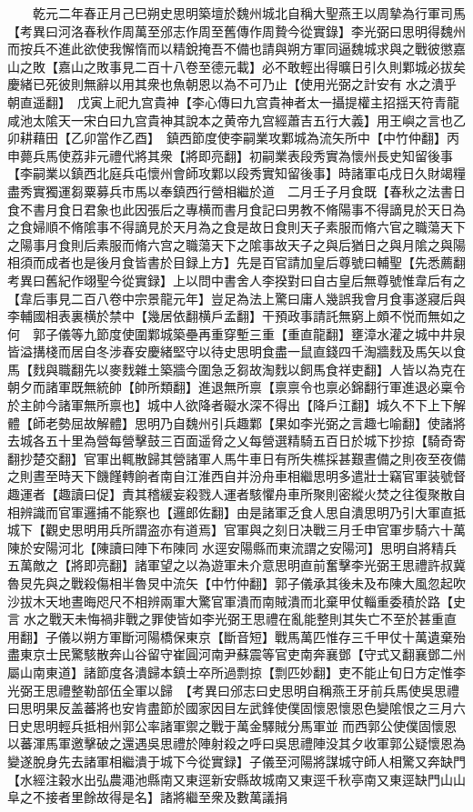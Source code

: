 　　乾元二年春正月己巳朔史思明築壇於魏州城北自稱大聖燕王以周摯為行軍司馬　【考異曰河洛春秋作周萬至邠志作周至舊傳作周贄今從實錄】李光弼曰思明得魏州而按兵不進此欲使我懈惰而以精銳掩吾不備也請與朔方軍同逼魏城求與之戰彼懲嘉山之敗【嘉山之敗事見二百十八卷至德元載】必不敢輕出得曠日引久則鄴城必拔矣慶緒已死彼則無辭以用其衆也魚朝恩以為不可乃止【使用光弼之計安有水之潰乎朝直遥翻】　戊寅上祀九宫貴神【李心傳曰九宫貴神者太一攝提權主招揺天符青龍咸池太隂天一宋白曰九宫貴神其說本之黄帝九宫經蕭吉五行大義】用王嶼之言也乙卯耕藉田【乙卯當作乙酉】　鎮西節度使李嗣業攻鄴城為流矢所中【中竹仲翻】丙申薨兵馬使荔非元禮代將其衆【將即亮翻】初嗣業表段秀實為懷州長史知留後事【李嗣業以鎮西北庭兵屯懷州會師攻鄴以段秀實知留後事】時諸軍屯戍日久財竭糧盡秀實獨運芻粟募兵市馬以奉鎮西行營相繼於道　二月壬子月食既【春秋之法書日食不書月食日君象也此因張后之專横而書月食記曰男教不脩陽事不得謫見於天日為之食婦順不脩隂事不得謫見於天月為之食是故日食則天子素服而脩六官之職蕩天下之陽事月食則后素服而脩六宫之職蕩天下之隂事故天子之與后猶日之與月隂之與陽相須而成者也是後月食皆書於目録上方】先是百官請加皇后尊號曰輔聖【先悉薦翻　考異曰舊紀作翊聖今從實録】上以問中書舍人李揆對曰自古皇后無尊號惟韋后有之【韋后事見二百八卷中宗景龍元年】豈足為法上驚曰庸人幾誤我會月食事遂寢后與李輔國相表裏横於禁中【幾居依翻横戶孟翻】干預政事請託無窮上頗不悦而無如之何　郭子儀等九節度使圍鄴城築壘再重穿塹三重【重直龍翻】壅漳水灌之城中井泉皆溢搆棧而居自冬涉春安慶緒堅守以待史思明食盡一鼠直錢四千淘牆䴰及馬矢以食馬【䴰與職翻先以麥䴰雜土築牆今圍急乏芻故淘䴰以飼馬食祥吏翻】人皆以為克在朝夕而諸軍既無統帥【帥所類翻】進退無所禀【禀禀令也禀必錦翻行軍進退必稟令於主帥今諸軍無所禀也】城中人欲降者礙水深不得出【降戶江翻】城久不下上下解體【師老勢屈故解體】思明乃自魏州引兵趣鄴【果如李光弼之言趣七喻翻】使諸將去城各五十里為營每營擊鼓三百面遥脅之乂每營選精騎五百日於城下抄掠【騎奇寄翻抄楚交翻】官軍出輒散歸其營諸軍人馬牛車日有所失樵採甚艱晝備之則夜至夜備之則晝至時天下饑饉轉餉者南自江淮西自并汾舟車相繼思明多遣壯士竊官軍装號督趣運者【趣讀曰促】責其稽緩妄殺戮人運者駭懼舟車所聚則密縱火焚之往復聚散自相辨識而官軍邏捕不能察也【邏郎佐翻】由是諸軍乏食人思自潰思明乃引大軍直抵城下【觀史思明用兵所謂盗亦有道焉】官軍與之刻日决戰三月壬申官軍步騎六十萬陳於安陽河北【陳讀曰陣下布陳同水逕安陽縣而東流謂之安陽河】思明自將精兵五萬敵之【將即亮翻】諸軍望之以為遊軍未介意思明直前奮擊李光弼王思禮許叔冀魯炅先與之戰殺傷相半魯炅中流矢【中竹仲翻】郭子儀承其後未及布陳大風忽起吹沙拔木天地晝晦咫尺不相辨兩軍大驚官軍潰而南賊潰而北棄甲仗輜重委積於路【史言水之戰天未悔禍非戰之罪使皆如李光弼王思禮在亂能整則其失亡不至於甚重直用翻】子儀以朔方軍斷河陽橋保東京【斷音短】戰馬萬匹惟存三千甲仗十萬遺棄殆盡東京士民驚駭散奔山谷留守崔圓河南尹蘇震等官吏南奔襄鄧【守式又翻襄鄧二州屬山南東道】諸節度各潰歸本鎮士卒所過剽掠【剽匹妙翻】吏不能止旬日方定惟李光弼王思禮整勒部伍全軍以歸　【考異曰邠志曰史思明自稱燕王牙前兵馬使吳思禮曰思明果反盖蕃將也安肯盡節於國家因目左武鋒使僕固懷恩懷恩色變隂恨之三月六日史思明輕兵抵相州郭公率諸軍禦之戰于萬金驛賊分馬軍並而西郭公使僕固懷恩以蕃渾馬軍邀擊破之還遇吳思禮於陣射殺之呼曰吳思禮陣没其夕收軍郭公疑懷恩為變遂脫身先去諸軍相繼潰于城下今從實録】子儀至河陽將謀城守師人相驚又奔缺門【水經注穀水出弘農澠池縣南又東逕新安縣故城南又東逕千秋亭南又東逕缺門山山阜之不接者里餘故得是名】諸將繼至衆及數萬議捐